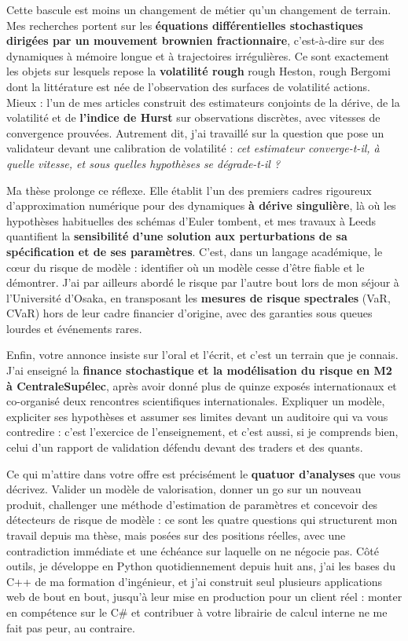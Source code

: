 \documentclass[10pt,a4paper]{article}
\newcommand{\cpp}{\mbox{C++}}
\begin{document}
Cette bascule est moins un changement de métier qu'un changement de terrain. Mes recherches portent sur les
\textbf{équations différentielles stochastiques dirigées par un mouvement brownien fractionnaire}, c'est-à-dire
sur des dynamiques à mémoire longue et à trajectoires irrégulières. Ce sont exactement les objets sur lesquels
repose la \textbf{volatilité rough} \textemdash{} rough Heston, rough Bergomi \textemdash{} dont la littérature
est née de l'observation des surfaces de volatilité actions. Mieux : l'un de mes articles construit des
estimateurs conjoints de la dérive, de la volatilité et de \textbf{l'indice de Hurst} sur observations
discrètes, avec vitesses de convergence prouvées. Autrement dit, j'ai travaillé sur la question que pose un
validateur devant une calibration de volatilité : \emph{cet estimateur converge-t-il, à quelle vitesse, et sous
quelles hypothèses se dégrade-t-il ?}

Ma thèse prolonge ce réflexe. Elle établit l'un des premiers cadres rigoureux d'approximation numérique pour
des dynamiques \textbf{à dérive singulière}, là où les hypothèses habituelles des schémas d'Euler tombent, et
mes travaux à Leeds quantifient la \textbf{sensibilité d'une solution aux perturbations de sa spécification et
de ses paramètres}. C'est, dans un langage académique, le cœur du risque de modèle : identifier où un modèle
cesse d'être fiable et le démontrer. J'ai par ailleurs abordé le risque par l'autre bout lors de mon séjour à
l'Université d'Osaka, en transposant les \textbf{mesures de risque spectrales} (VaR, CVaR) hors de leur cadre
financier d'origine, avec des garanties sous queues lourdes et événements rares.

Enfin, votre annonce insiste sur l'oral et l'écrit, et c'est un terrain que je connais. J'ai enseigné la
\textbf{finance stochastique et la modélisation du risque en M2 à CentraleSupélec}, après avoir donné plus de
quinze exposés internationaux et co-organisé deux rencontres scientifiques internationales. Expliquer un
modèle, expliciter ses hypothèses et
assumer ses limites devant un auditoire qui va vous contredire : c'est l'exercice de l'enseignement, et c'est
aussi, si je comprends bien, celui d'un rapport de validation défendu devant des traders et des quants.

Ce qui m'attire dans votre offre est précisément le \textbf{quatuor d'analyses} que vous décrivez. Valider un
modèle de valorisation, donner un go sur un nouveau produit, challenger une méthode d'estimation de paramètres
et concevoir des détecteurs de risque de modèle : ce sont les quatre questions qui structurent mon travail
depuis ma thèse, mais posées sur des positions réelles, avec une contradiction immédiate et une échéance sur
laquelle on ne négocie pas. Côté outils, je
développe en Python quotidiennement depuis huit ans, j'ai les bases du \cpp{} de ma formation d'ingénieur, et
j'ai construit seul plusieurs applications web de bout en bout, jusqu'à leur mise en production pour un client
réel : monter en compétence sur le C\# et contribuer à votre librairie de calcul interne ne me fait pas peur,
au contraire.
\end{document}
